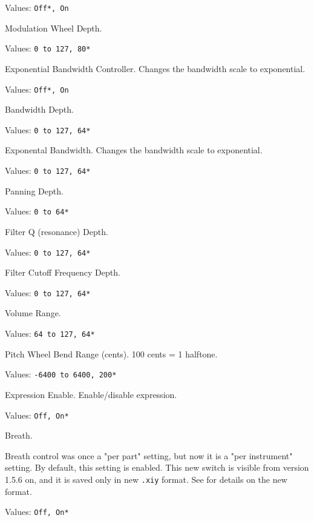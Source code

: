    Values: \texttt{Off*, On}

   Modulation Wheel Depth.

   Values: \texttt{0 to 127, 80*}

   Exponential Bandwidth Controller.
   Changes the bandwidth scale to exponential.

   Values: \texttt{Off*, On}

   Bandwidth Depth.

   Values: \texttt{0 to 127, 64*}

   Exponental Bandwidth.
   Changes the bandwidth scale to exponential.

   Values: \texttt{0 to 127, 64*}

   Panning Depth.

   Values: \texttt{0 to 64*}

   Filter Q (resonance) Depth.

   Values: \texttt{0 to 127, 64*}

   Filter Cutoff Frequency Depth.

   Values: \texttt{0 to 127, 64*}

   Volume Range.

   Values: \texttt{64 to 127, 64*}

   Pitch Wheel Bend Range (cents).
   100 cents = 1 halftone.

   Values: \texttt{-6400 to 6400, 200*}

   Expression Enable.
   Enable/disable expression.

   Values: \texttt{Off, On*}

   Breath.

   Breath control was once a "per part" setting, but now it is a
   "per instrument" setting.  By default, this setting is enabled.
   This new switch is visible from version 1.5.6 on, and it is saved only in
   new \texttt{.xiy} format.
   See  for details on the new format.

   Values: \texttt{Off, On*}

